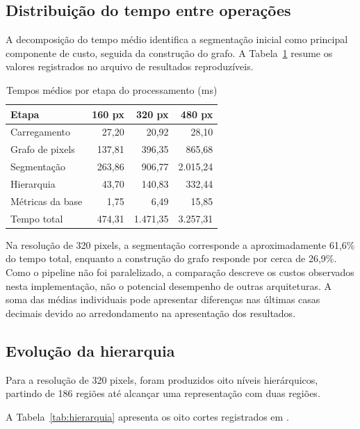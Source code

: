 \documentclass[12pt]{article}
\begin{document}
\subsection{Distribuição do tempo entre operações}

A decomposição do tempo médio identifica a segmentação inicial como
principal componente de custo, seguida da construção do grafo.
A Tabela~\ref{tab:etapas} resume os valores registrados no
arquivo de resultados reproduzíveis.

\begin{table}[htbp]
\centering
\caption{Tempos médios por etapa do processamento (ms)}
\label{tab:etapas}
\small
\begin{tabular}{lrrr}
\toprule
Etapa & 160 px & 320 px & 480 px \\
\midrule
Carregamento & 27,20 & 20,92 & 28,10 \\
Grafo de pixels & 137,81 & 396,35 & 865,68 \\
Segmentação & 263,86 & 906,77 & 2.015,24 \\
Hierarquia & 43,70 & 140,83 & 332,44 \\
Métricas da base & 1,75 & 6,49 & 15,85 \\
\midrule
Tempo total & 474,31 & 1.471,35 & 3.257,31 \\
\bottomrule
\end{tabular}
\end{table}

Na resolução de 320 pixels, a segmentação corresponde a
aproximadamente 61,6\% do tempo total, enquanto a construção do grafo
responde por cerca de 26,9\%. Como o pipeline não foi paralelizado,
a comparação descreve os custos observados nesta implementação,
não o potencial desempenho de outras arquiteturas. A soma das
médias individuais pode apresentar diferenças nas últimas casas
decimais devido ao arredondamento na apresentação dos resultados.

\subsection{Evolução da hierarquia}

Para a resolução de 320 pixels,
foram produzidos oito níveis hierárquicos,
partindo de 186 regiões até alcançar
uma representação com duas regiões.

A Tabela~\ref{tab:hierarquia} apresenta os oito cortes
registrados em .
\end{document}

